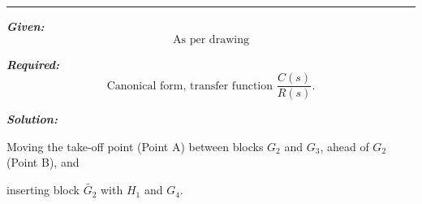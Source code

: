 \documentclass[11pt]{article}
\begin{document}
\noindent\rule{\textwidth}{1pt}

\vspace{5pt}

\noindent\textbf{\textit{Given:}}  
\[
\text{As per drawing}
\]



\vspace{1em}
\noindent

\noindent\textbf{\textit{Required:}}  
\[
\text{Canonical form, transfer function } \frac{C(s)}{R(s)}.
\]

\vspace{1.5em}
\noindent\textbf{\textit{Solution:}}

\vspace{5pt}

 Moving the take-off point (Point A) between blocks $G_2$ and $G_3$, ahead of $G_2$ (Point B), and 
 
 inserting block $\tilde{G_2}$ with $H_1$ and $G_4$.


\vspace{5pt}
\end{document}
